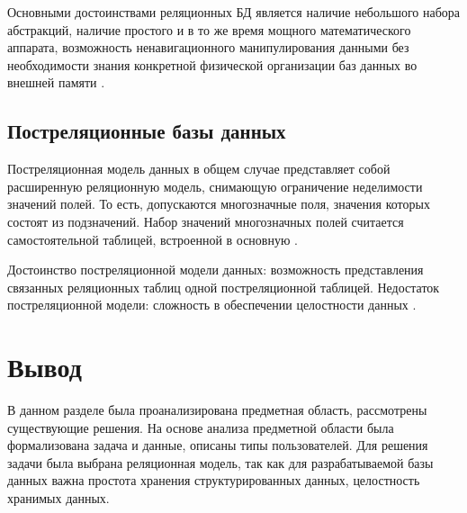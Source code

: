 Основными достоинствами реляционных БД является наличие небольшого набора абстракций, наличие простого и в то же время мощного математического аппарата, возможность ненавигационного манипулирования данными без необходимости знания конкретной физической организации баз данных во внешней памяти \cite{info_db_kuznecov}.

\clearpage

\subsection{Постреляционные базы данных}

Постреляционная модель данных в общем случае представляет собой расширенную реляционную модель, снимающую ограничение неделимости значений полей. То есть, допускаются многозначные поля, значения которых состоят из подзначений. Набор значений многозначных полей считается самостоятельной таблицей, встроенной в основную \cite{info_db_sopchenko}.

Достоинство постреляционной модели данных: возможность представления связанных реляционных таблиц одной постреляционной таблицей.  Недостаток постреляционной модели: сложность в обеспечении целостности данных \cite{info_db_sopchenko}.
                         
\section*{Вывод} 

В данном разделе была проанализирована предметная область, рассмотрены существующие решения. На основе анализа предметной области была формализована задача и данные, описаны типы пользователей. Для решения задачи была выбрана реляционная модель, так как для разрабатываемой базы данных важна простота хранения структурированных данных, целостность хранимых данных.